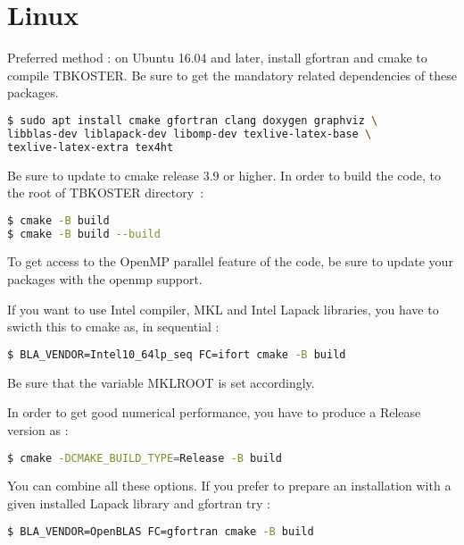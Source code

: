 \documentclass[12pt, onecolumn]{memoir}
\begin{document}
\section{Linux}
Preferred method : on Ubuntu 16.04 and later, install gfortran and cmake to compile TBKOSTER. Be sure to get the mandatory related dependencies of these packages.
\begin{lstlisting}[language=sh,basicstyle=\small]
$ sudo apt install cmake gfortran clang doxygen graphviz \
libblas-dev liblapack-dev libomp-dev texlive-latex-base \
texlive-latex-extra tex4ht
\end{lstlisting}
Be sure to update to cmake release 3.9 or higher.
In order to build the code, to the root of TBKOSTER directory~:
\begin{lstlisting}[language=sh,basicstyle=\small]
$ cmake -B build
$ cmake -B build --build
\end{lstlisting}
To get access to the OpenMP parallel feature of the code, be sure to update your packages with the openmp support.

If you want to use Intel compiler, MKL and Intel Lapack libraries, you have to swicth this to cmake as, in sequential :
\begin{lstlisting}[language=sh,basicstyle=\small]
$ BLA_VENDOR=Intel10_64lp_seq FC=ifort cmake -B build
\end{lstlisting}
Be sure that the variable MKLROOT is set accordingly.

In order to get good numerical performance, you have to produce a Release version as :
\begin{lstlisting}[language=sh,basicstyle=\small]
$ cmake -DCMAKE_BUILD_TYPE=Release -B build
\end{lstlisting}
You can combine all these options.
If you prefer to prepare an installation with a given installed Lapack library and gfortran try :
\begin{lstlisting}[language=sh,basicstyle=\small]
$ BLA_VENDOR=OpenBLAS FC=gfortran cmake -B build
\end{lstlisting}
\end{document}
